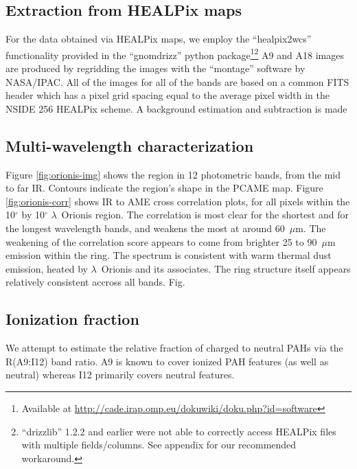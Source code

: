 		\subsection{Extraction from HEALPix maps}
		  For the data obtained via HEALPix maps, we employ the ``healpix2wcs'' functionality provided in the ``gnomdrizz'' python package\footnote{Available at \url{http://cade.irap.omp.eu/dokuwiki/doku.php?id=software}}\footnote{``drizzlib'' 1.2.2 and earlier were not able to correctly access HEALPix files with multiple fields/columns. See appendix for our recommended workaround.} A9 and A18 images are produced by regridding the images with the ``montage'' software by NASA/IPAC. All of the images for all of the bands are based on a common FITS header which has a pixel grid spacing equal to the average pixel width in the NSIDE 256 HEALPix scheme.
      A background estimation and subtraction is made

		\subsection{Multi-wavelength characterization}
			Figure \ref{fig:orionis-img} shows the region in 12 photometric bands, from the mid to far IR. Contours indicate the region's shape in the PCAME map. Figure \ref{fig:orionis-corr} shows IR to AME cross correlation plots, for all pixels within the 10$^{\circ}$ by 10$^{\circ}$ $\lambda$~Orionis region. The correlation is most clear for the shortest and for the longest wavelength bands, and weakens the most at around 60~$\mu$m. The weakening of the correlation score appears to come from brighter 25 to 90~$\mu$m emission within the ring. The spectrum is consistent with warm thermal dust emission, heated by $\lambda$~Orionis and its associates. The ring structure itself appears relatively consistent accross all bands. Fig. \

		\subsection{Ionization fraction}
			We attempt to estimate the relative fraction of charged to neutral PAHs via the R(A9:I12) band ratio. A9 is known to cover ionized PAH features (as well as neutral) whereas I12 primarily covers neutral features.


